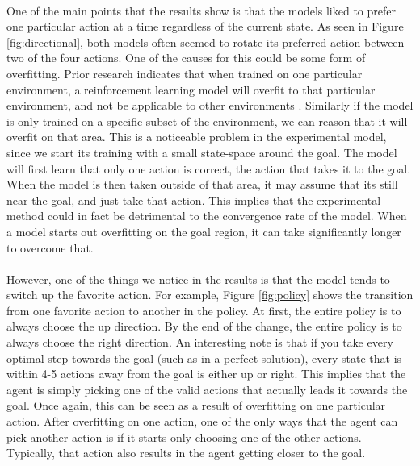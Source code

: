 \documentclass[12pt]{article}
\begin{document}
\paragraph{}
One of the main points that the results show is that the models liked to prefer one particular action at a time regardless of the current state.
As seen in Figure \ref{fig:directional}, both models often seemed to rotate its preferred action between two of the four actions. %
One of the causes for this could be some form of overfitting.
Prior research indicates that when trained on one particular environment, a reinforcement learning model will overfit to that particular environment, and not be applicable to other environments \cite{article_overfitting_neural_networks}.
Similarly if the model is only trained on a specific subset of the environment, we can reason that it will overfit on that area.
This is a noticeable problem in the experimental model, since we start its training with a small state-space around the goal.
The model will first learn that only one action is correct, the action that takes it to the goal.
When the model is then taken outside of that area, it may assume that its still near the goal, and just take that action.
This implies that the experimental method could in fact be detrimental to the convergence rate of the model.
When a model starts out overfitting on the goal region, it can take significantly longer to overcome that.

\paragraph{}
However, one of the things we notice in the results is that the model tends to switch up the favorite action.
For example, Figure \ref{fig:policy} shows the transition from one favorite action to another in the policy.
At first, the entire policy is to always choose the up direction.
By the end of the change, the entire policy is to always choose the right direction.
An interesting note is that if you take every optimal step towards the goal (such as in a perfect solution), every state that is within 4-5 actions away from the goal is either up or right.
This implies that the agent is simply picking one of the valid actions that actually leads it towards the goal.
Once again, this can be seen as a result of overfitting on one particular action.
After overfitting on one action, one of the only ways that the agent can pick another action is if it starts only choosing one of the other actions.
Typically, that action also results in the agent getting closer to the goal.
\end{document}
